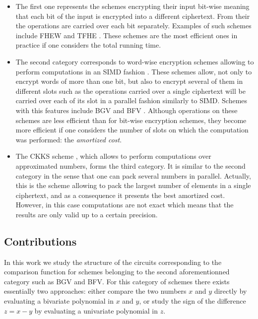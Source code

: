 \begin{itemize}
\item The first one represents the schemes encrypting their input bit-wise meaning that each bit of the input is encrypted into a different ciphertext. From their the operations are carried over each bit separately. Examples of such schemes include FHEW \cite{DM15} and TFHE \cite{CGGI16}. These schemes are the most efficient ones in practice if one considers the total running time.
  
\item The second category corresponds to word-wise encryption schemes allowing to perform computations in an \ac{SIMD} fashion \cite{SV14}. These schemes allow, not only to encrypt words of more than one bit, but also to encrypt several of them in different slots such as the operations carried over a single ciphertext will be carried over each of its slot in a parallel fashion similarly to \ac{SIMD}. Schemes with this features include BGV \cite{BGV12} and BFV \cite{FV12}. Although operations on these schemes are less efficient than for bit-wise encryption schemes, they become more efficient if one considers the number of slots on which the computation was performed: the \emph{amortized cost}.

\item The CKKS scheme \cite{CKKS17}, which allows to perform computations over approximated numbers, forms the third category. It is similar to the second category in the sense that one can pack several numbers in parallel. Actually, this is the scheme allowing to pack the largest number of elements in a single ciphertext, and as a consequence it presents the best amortized cost. However, in this case computations are not exact which means that the results are only valid up to a certain precision.
\end{itemize}


\subsection{Contributions}
In this work we study the structure of the circuits corresponding to the comparison function for schemes belonging to the second aforementionned category such as BGV and BFV. For this category of schemes there exists essentially two approaches: either compare the two numbers $x$ and $y$ directly by evaluating a bivariate polynomial in $x$ and $y$, or study the sign of the difference $z=x-y$ by evaluating a univariate polynomial in $z$.

